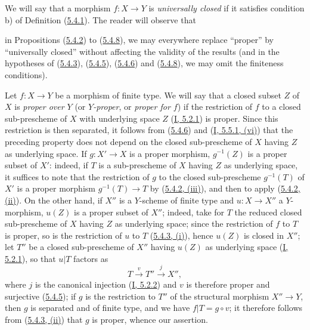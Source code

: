 \begin{remark}[5.4.9]
\label{II.5.4.9}
We will say that a morphism $f:X\to Y$ is \emph{universally closed} if it
satisfies condition b) of Definition
(\hyperref[II.5.4.1]{5.4.1}). The reader will observe that


in Propositions (\hyperref[II.5.4.2]{5.4.2}) to
(\hyperref[II.5.4.8]{5.4.8}), we may everywhere replace ``proper'' by
``universally closed'' without affecting the validity of the results (and in
the hypotheses of (\hyperref[II.5.4.3]{5.4.3}),
(\hyperref[II.5.4.5]{5.4.5}), (\hyperref[II.5.4.6]{5.4.6}) and
(\hyperref[II.5.4.8]{5.4.8}), we may omit the finiteness
conditions).
\end{remark}

\begin{env}[5.4.10]
\label{II.5.4.10}
Let $f:X\to Y$ be a morphism of finite type. We will say that a closed subset
$Z$ of $X$ is \emph{proper over $Y$} (or \emph{$Y$-proper}, or \emph{proper
for $f$}) if the restriction of $f$ to a closed sub-prescheme of $X$
with underlying space $Z$ (\hyperref[I.5.2.1]{I, 5.2.1}) is proper.
Since this restriction is then separated, it follows from
(\hyperref[II.5.4.6]{5.4.6}) and (\hyperref[I.5.5.1]{I, 5.5.1, (vi)})
that the preceding property does not depend on the closed sub-prescheme of
$X$ having $Z$ as underlying space. If $g:X'\to X$ is a proper morphism,
$g^{-1}(Z)$ is a proper subset of $X'$: indeed, if $T$ is a sub-prescheme of
$X$ having $Z$ as underlying space, it suffices to note that the
restriction of $g$ to the closed sub-prescheme $g^{-1}(T)$ of $X'$ is a
proper morphism $g^{-1}(T)\to T$ by
(\hyperref[II.5.4.2]{5.4.2, (iii)}), and then to apply
(\hyperref[II.5.4.2]{5.4.2, (ii)}). On the other hand, if $X''$ is a
$Y$-scheme of finite type and $u:X\to X''$ a $Y$-morphism, $u(Z)$ is a
proper subset of $X''$; indeed, take for $T$ the reduced closed
sub-prescheme of $X$ having $Z$ as underlying space; since the restriction
of $f$ to $T$ is proper, so is the restriction of $u$ to $T$
(\hyperref[II.5.4.3]{5.4.3, (i)}), hence $u(Z)$ is closed in $X''$;
let $T''$ be a closed sub-prescheme of $X''$ having $u(Z)$ as underlying
space (\hyperref[I.5.2.1]{I, 5.2.1}), so that $u|T$ factors as
\[
  T\xrightarrow{v}T''\xrightarrow{j}X'',
\]
where $j$ is the canonical injection (\hyperref[I.5.2.2]{I, 5.2.2}) and $v$
is therefore proper and surjective (\hyperref[II.5.4.5]{5.4.5}); if $g$ is
the restriction to $T''$ of the structural morphism $X''\to Y$, then $g$ is
separated and of finite type, and we have $f|T=g\circ v$; it therefore
follows from (\hyperref[II.5.4.3]{5.4.3, (ii)}) that $g$ is proper, whence
our assertion.
\end{env}

